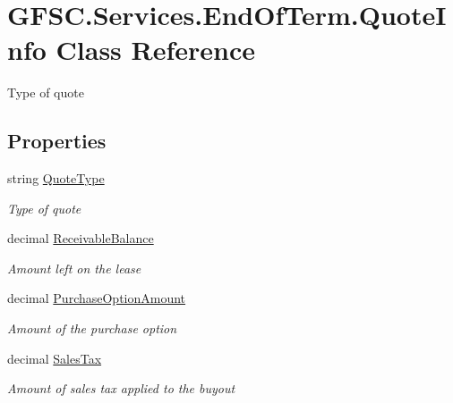 \hypertarget{class_g_f_s_c_1_1_services_1_1_end_of_term_1_1_quote_info}{}\section{G\+F\+S\+C.\+Services.\+End\+Of\+Term.\+Quote\+Info Class Reference}
\label{class_g_f_s_c_1_1_services_1_1_end_of_term_1_1_quote_info}


Type of quote  


\subsection*{Properties}
\begin{DoxyCompactItemize}
\item 
string \mbox{\hyperlink{class_g_f_s_c_1_1_services_1_1_end_of_term_1_1_quote_info_abcde88604b5e1dd0e68c13a14e1dc98d}{Quote\+Type}}
\begin{DoxyCompactList}\small\item\em Type of quote \end{DoxyCompactList}\item 
decimal \mbox{\hyperlink{class_g_f_s_c_1_1_services_1_1_end_of_term_1_1_quote_info_a99b3e5dd14126377c3d6e619e2e016a7}{Receivable\+Balance}}
\begin{DoxyCompactList}\small\item\em Amount left on the lease \end{DoxyCompactList}\item 
decimal \mbox{\hyperlink{class_g_f_s_c_1_1_services_1_1_end_of_term_1_1_quote_info_ab3bed71e5768f3dbab3ec5daa1a1e796}{Purchase\+Option\+Amount}}
\begin{DoxyCompactList}\small\item\em Amount of the purchase option \end{DoxyCompactList}\item 
decimal \mbox{\hyperlink{class_g_f_s_c_1_1_services_1_1_end_of_term_1_1_quote_info_a7f9fe095fa8a53d3953744f652827ae4}{Sales\+Tax}}
\begin{DoxyCompactList}\small\item\em Amount of sales tax applied to the buyout \end{DoxyCompactList}\item 

\end{DoxyCompactItemize}
